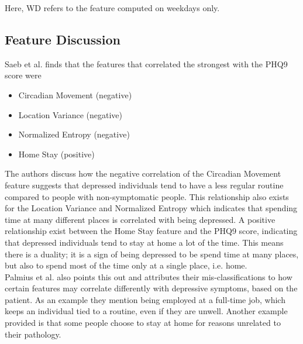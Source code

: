 Here, WD refers to the feature computed on weekdays only.\\

\subsection{Feature Discussion}
Saeb et al. finds that the features that correlated the strongest with the PHQ9 score were 
\begin{itemize}
    \item Circadian Movement (negative)
    \item Location Variance (negative)
    \item Normalized Entropy (negative)
    \item Home Stay (positive)
\end{itemize}

The authors discuss how the negative correlation of the Circadian Movement feature suggests that depressed individuals tend to have a less regular routine compared to people with non-symptomatic people. This relationship also exists for the Location Variance and Normalized Entropy which indicates that spending time at many different places is correlated with being depressed. A positive relationship exist between the Home Stay feature and the PHQ9 score, indicating that depressed individuals tend to stay at home a lot of the time. This means there is a duality; it is a sign of being depressed to be spend time at many places, but also to spend most of the time only at a single place, i.e. home.\\

Palmius et al. also points this out and attributes their mis-classifications to how certain features may correlate differently with depressive symptoms, based on the patient. As an example they mention being employed at a full-time job, which keeps an individual tied to a routine, even if they are unwell. Another example provided is that some people choose to stay at home for reasons unrelated to their pathology. 